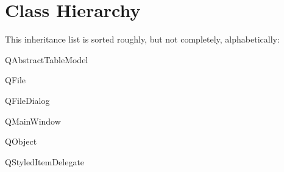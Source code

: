 \section{Class Hierarchy}
This inheritance list is sorted roughly, but not completely, alphabetically\+:\begin{DoxyCompactList}
\item {}
\item {}
\item Q\+Abstract\+Table\+Model\begin{DoxyCompactList}
\item {}
\end{DoxyCompactList}
\item Q\+File\begin{DoxyCompactList}
\item {}
\end{DoxyCompactList}
\item Q\+File\+Dialog\begin{DoxyCompactList}
\item {}
\end{DoxyCompactList}
\item Q\+Main\+Window\begin{DoxyCompactList}
\item {}
\end{DoxyCompactList}
\item Q\+Object\begin{DoxyCompactList}
\item {}
\end{DoxyCompactList}
\item Q\+Styled\+Item\+Delegate\begin{DoxyCompactList}
\item {}
\end{DoxyCompactList}
\end{DoxyCompactList}
